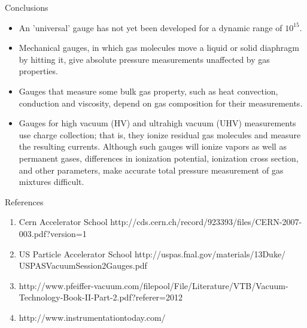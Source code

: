 \documentclass[11pt]{beamer}
\begin{document}
\begin{frame}{Conclusions}

\begin{itemize}
          \item An 'universal' gauge has not yet been developed for a dynamic range of $10^{15}$. 
          \item Mechanical gauges, in which gas molecules move a liquid or solid diaphragm by hitting it, give absolute pressure measurements unaffected by gas properties. 
          \item Gauges that measure some bulk gas property, such as heat convection, conduction and viscosity, depend on gas composition for their measurements.
               
          \item Gauges for high vacuum (HV) and ultrahigh vacuum (UHV) measurements use charge collection; that is, they ionize residual gas molecules and measure the resulting currents. Although such gauges will ionize vapors as well as permanent gases, differences in ionization potential, ionization cross section, and other parameters, make accurate total pressure measurement of gas mixtures difficult.
         
        \end{itemize}




 



\end{frame}

\begin{frame}{References}

\begin{enumerate}
  \item Cern Accelerator School http://cds.cern.ch/record/923393/files/CERN-2007-003.pdf?version=1
  \item US Particle Accelerator School http://uspas.fnal.gov/materials/13Duke/\\USPASVacuumSession2Gauges.pdf
  
  \item http://www.pfeiffer-vacuum.com/filepool/File/Literature/VTB/Vacuum-Technology-Book-II-Part-2.pdf?referer=2012
  \item http://www.instrumentationtoday.com/
\end{enumerate}





\end{frame}
\end{document}
